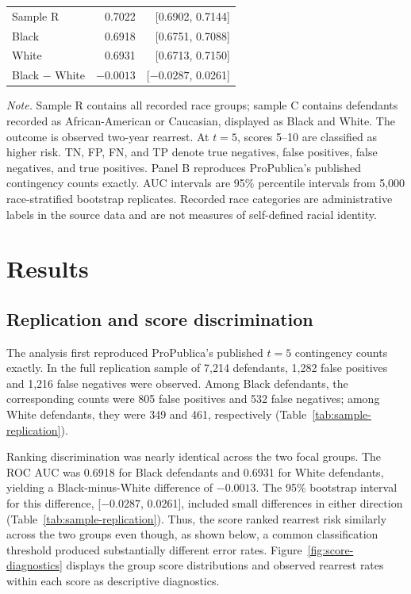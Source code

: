 \documentclass[11pt,letterpaper]{article}
\begin{document}
\begin{table}[p]
\begin{threeparttable}
\begin{tabular*}{\textwidth}{@{\extracolsep{\fill}}lrr@{}}
Sample R & 0.7022 & [0.6902, 0.7144] \\
Black & 0.6918 & [0.6751, 0.7088] \\
White & 0.6931 & [0.6713, 0.7150] \\
Black $-$ White & $-0.0013$ & [$-0.0287$, 0.0261] \\
\bottomrule
\end{tabular*}
\begin{tablenotes}[flushleft]
\footnotesize
\item \textit{Note.} Sample R contains all recorded race groups; sample C contains defendants recorded as African-American or Caucasian, displayed as Black and White. The outcome is observed two-year rearrest. At $t=5$, scores 5--10 are classified as higher risk. TN, FP, FN, and TP denote true negatives, false positives, false negatives, and true positives. Panel B reproduces ProPublica's published contingency counts exactly. AUC intervals are 95\% percentile intervals from 5,000 race-stratified bootstrap replicates. Recorded race categories are administrative labels in the source data and are not measures of self-defined racial identity.
\end{tablenotes}
\end{threeparttable}
\end{table}

\section{Results}

\subsection{Replication and score discrimination}

The analysis first reproduced ProPublica's published $t=5$ contingency counts exactly. In the full replication sample of 7,214 defendants, 1,282 false positives and 1,216 false negatives were observed. Among Black defendants, the corresponding counts were 805 false positives and 532 false negatives; among White defendants, they were 349 and 461, respectively (Table~\ref{tab:sample-replication}).

Ranking discrimination was nearly identical across the two focal groups. The ROC AUC was 0.6918 for Black defendants and 0.6931 for White defendants, yielding a Black-minus-White difference of $-0.0013$. The 95\% bootstrap interval for this difference, [$-0.0287$, 0.0261], included small differences in either direction (Table~\ref{tab:sample-replication}). Thus, the score ranked rearrest risk similarly across the two groups even though, as shown below, a common classification threshold produced substantially different error rates. Figure~\ref{fig:score-diagnostics} displays the group score distributions and observed rearrest rates within each score as descriptive diagnostics.
\end{document}
